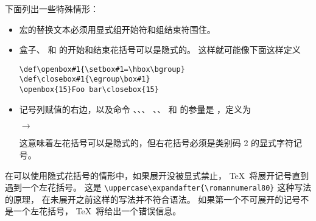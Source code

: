 \documentclass{book}
\begin{document}
下面列出一些特殊情形：
\begin{itemize}
\item 宏的替换文本必须用显式组开始符和组结束符围住。
\item 盒子、 和  的开始和结束花括号可以是隐式的。
这样就可能像下面这样定义
\begin{verbatim}
\def\openbox#1{\setbox#1=\hbox\bgroup}
\def\closebox#1{\egroup\box#1}
\openbox{15}Foo bar\closebox{15}
\end{verbatim}
\item 记号列赋值的右边，以及命令 、、、 
、、 和  的参量是
，定义为
\begin{Disp}  $\longrightarrow$ \lb
      \end{Disp}
这意味着左花括号可以是隐式的，但右花括号必须是类别码 2 
的显式字符记号。
\end{itemize}

在可以使用隐式花括号的情形中，如果展开没被显式禁止，
\TeX\ 将展开记号直到遇到一个左花括号。
这是 \verb=\uppercase\expandafter{\romannumeral80}= 这种写法的原理，
在未展开之前这样的写法并不符合语法。
如果第一个不可展开的记号不是一个左花括号，
\TeX\ 将给出一个错误信息。
\end{document}
